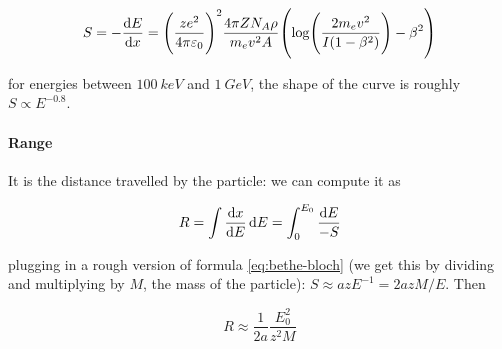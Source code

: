 \documentclass{article}
\begin{document}
\begin{equation} \label{eq:bethe-bloch}
    S = - \dv{E}{x} = \qty(\frac{ze^2}{4 \pi \varepsilon_0})^2 \frac{4 \pi Z N_A \rho}{m_e v^2 A}
    \qty(\log(\frac{2m_e v^2}{I (1-\beta^2)}) - \beta^2)
\end{equation}

for energies between \(\SI{100}{keV} \) and \(\SI{1}{GeV}\), the shape of the curve is roughly \(S \propto E^{-0.8}\).

\paragraph{Range}

It is the distance travelled by the particle: we can compute it as

\begin{equation}
    R = \int  \dv{x}{E}  \dd{E}  = \int _{0}   ^{E_0} \frac{\dd{E}}{-S}
\end{equation}

plugging in a rough version of formula \eqref{eq:bethe-bloch} (we get this by dividing and multiplying by \(M\), the mass of the particle): \(S \approx a z E^{-1} = 2 a z M  /E\). Then

\begin{equation}
    R \approx \frac{1}{2a}  \frac{E_0^2}{z^2 M}
\end{equation}
\end{document}
